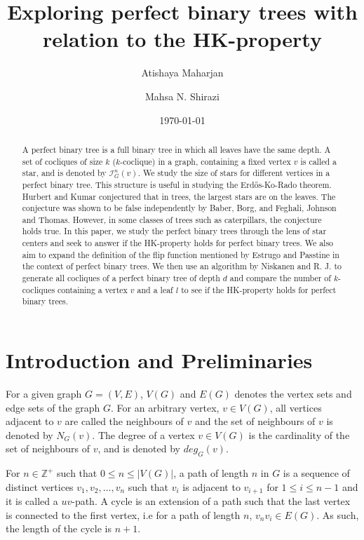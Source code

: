 \documentclass{amsart}
\title[]{Exploring perfect binary trees with relation to the HK-property}
\author[Atishaya Maharjan]{Atishaya Maharjan} \email[Atishaya Maharjan]{maharjaa@myumanitoba.ca}
\author[M.~N.~Shirazi]{Mahsa N. Shirazi} \email[M.~N.~Shirazi]{mahsa.nasrollahi@gmail.com}
\date{\today}
\theoremstyle{definition}
\begin{document}
\begin{abstract}
  A perfect binary tree is a full binary tree in which all leaves have the same depth. A set of cocliques of size $k$ ($k$-coclique) in a graph, containing a fixed vertex $v$ is called a star, and is denoted by $\mathcal{I}^n_G(v)$. We study the size of stars for different vertices in a perfect binary tree. This structure is useful in studying the Erd\H{o}s-Ko-Rado theorem. Hurbert and Kumar conjectured that in trees, the largest stars are on the leaves. The conjecture was shown to be false independently by Baber, Borg, and Feghali, Johnson and Thomas. However, in some classes of trees such as caterpillars, the conjecture holds true. In this paper, we study the perfect binary trees through the lens of star centers and seek to answer if the HK-property holds for perfect binary trees. We also aim to expand the definition of the flip function mentioned by Estrugo and Passtine in the context of perfect binary trees. We then use an algorithm by Niskanen and R. J. to generate all cocliques of a perfect binary tree of depth $d$ and compare the number of $k$-cocliques containing a vertex $v$ and a leaf $l$ to see if the HK-property holds for perfect binary trees.
\end{abstract}

\maketitle

\section{Introduction and Preliminaries}
For a given graph $G = (V,E)$, $V(G)$ and $E(G)$ denotes the vertex sets and edge sets of the graph $G$. For an arbitrary vertex, $v \in V(G)$, all vertices adjacent to $v$ are called the neighbours of $v$ and the set of neighbours of $v$ is denoted by $N_G(v)$. The degree of a vertex $v \in V(G)$ is the cardinality of the set of neighbours of $v$, and is denoted by $deg_G(v)$.

For $n \in \mathbb{Z^+}$ such that  $0 \leq n \leq |V(G)|$, a path of length $n$ in $G$ is a sequence of distinct vertices $v_1, v_2, \ldots, v_n$ such that $v_i$ is adjacent to $v_{i+1}$ for $1 \leq i \leq n-1$ and it is called a $uv$-path. A cycle is an extension of a path such that the last vertex is connected to the first vertex, i.e for a path of length $n$, $v_nv_i \in E(G)$. As such, the length of the cycle is $n + 1$.
\end{document}
